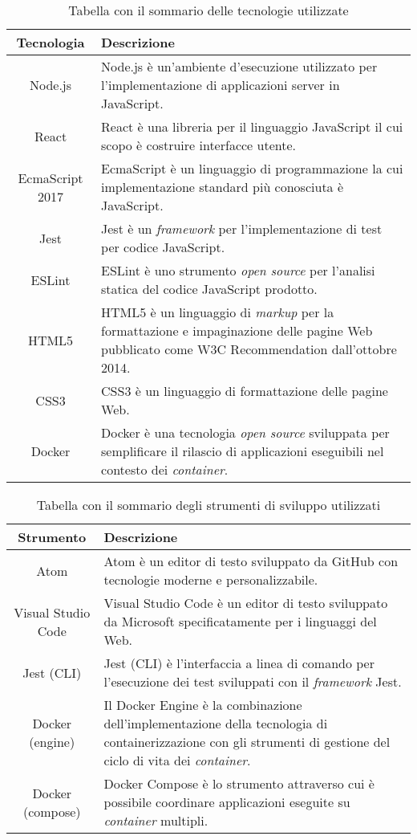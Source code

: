 \begin{table}[H]
\caption{Tabella con il sommario delle tecnologie utilizzate}
\label{tab:tecnologie}
\begin{tabularx}{\linewidth}{|c|X|}
\hline
\textbf{Tecnologia} & \textbf{Descrizione}\\
\hline
Node.js & Node.js è un'ambiente d'esecuzione utilizzato per l'implementazione di applicazioni server in JavaScript. \\
\hline
React & React è una libreria per il linguaggio JavaScript il cui scopo è costruire interfacce utente. \\
\hline
EcmaScript 2017 & EcmaScript è un linguaggio di programmazione la cui implementazione standard più conosciuta è JavaScript. \\
\hline
Jest & Jest è un \emph{framework} per l'implementazione di test per codice JavaScript. \\
\hline
ESLint & ESLint è uno strumento \emph{open source} per l'analisi statica del codice JavaScript prodotto. \\
\hline
HTML5 & HTML5 è un linguaggio di \emph{markup} per la formattazione e impaginazione delle pagine Web pubblicato come W3C Recommendation dall'ottobre 2014. \\
\hline
CSS3 & CSS3 è un linguaggio di formattazione delle pagine Web. \\
\hline
Docker & Docker è una tecnologia \emph{open source} sviluppata per semplificare il rilascio di applicazioni eseguibili nel contesto dei \emph{container}. \\
\hline
\end{tabularx}
\end{table}

\begin{table}[H]
\caption{Tabella con il sommario degli strumenti di sviluppo utilizzati}
\label{tab:strumenti}
\begin{tabularx}{\linewidth}{|c|X|}
\hline
\textbf{Strumento} & \textbf{Descrizione}\\
\hline
Atom & Atom è un editor di testo sviluppato da GitHub con tecnologie moderne e personalizzabile. \\
\hline
Visual Studio Code & Visual Studio Code è un editor di testo sviluppato da Microsoft specificatamente per i linguaggi del Web. \\
\hline
Jest (CLI) & Jest (CLI) è l'interfaccia a linea di comando per l'esecuzione dei test sviluppati con il \emph{framework} Jest. \\
\hline
Docker (engine) & Il Docker Engine è la combinazione dell'implementazione della tecnologia di containerizzazione con gli strumenti di gestione del ciclo di vita dei \emph{container}. \\
\hline
Docker (compose) & Docker Compose è lo strumento attraverso cui è possibile coordinare applicazioni eseguite su \emph{container} multipli. \\
\hline
\end{tabularx}
\end{table}

